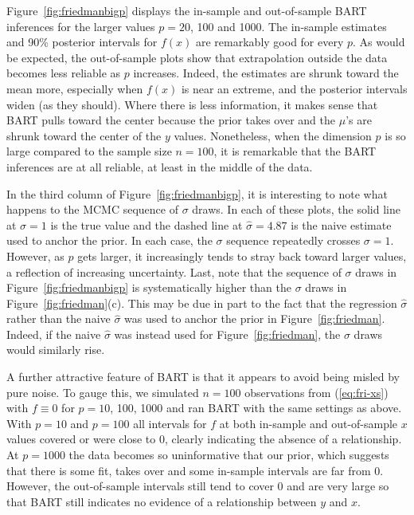 \documentclass[aoas,nameyear,dvips]{arximspdf}
\begin{document}
Figure~\ref{fig:friedmanbigp} displays the in-sample and
out-of-sample BART inferences for the larger values $p = 20$, 100
and 1000. The in-sample estimates and 90\% posterior intervals for
$f(x)$ are remarkably good for every $p$.  As would be expected,
the out-of-sample plots show that extrapolation outside the data
becomes less reliable as $p$ increases.  Indeed, the estimates
are shrunk toward the mean more, especially when $f(x)$ is near an extreme, and the
posterior intervals widen (as they should). Where there is less
information, it makes sense that BART pulls toward the center
because the prior takes over and the $\mu$'s are shrunk toward
the center of the $y$ values.  Nonetheless, when the dimension
$p$ is so large compared to the sample size $n = 100$, it is
remarkable that the BART inferences are at all reliable,
at least in the middle of the data.

In the third column of Figure~\ref{fig:friedmanbigp}, it is
interesting to note what happens to the MCMC sequence of $\sigma$
draws. In each of these plots, the solid line at $\sigma = 1$ is
the true value and the dashed line at $\hat\sigma = 4.87$ is the
naive estimate used to anchor the prior.  In each case, the
$\sigma$ sequence repeatedly crosses $\sigma = 1$. However, as $p$
gets larger, it increasingly tends to stray back toward larger
values, a reflection of increasing uncertainty. Last, note that
the sequence of $\sigma$ draws in Figure~\ref{fig:friedmanbigp}
is systematically higher than the $\sigma$ draws in
Figure~\ref{fig:friedman}(c). This may be due in part to the fact that
the regression $\hat\sigma$ rather than the naive $\hat\sigma$ was
used to anchor the prior in Figure~\ref{fig:friedman}. Indeed, if
the naive $\hat\sigma$ was instead used for
Figure~\ref{fig:friedman}, the $\sigma$ draws would similarly
rise.

A further attractive feature of BART is that it appears to avoid
being misled by pure noise.  To gauge this, we simulated $n = 100$
observations from (\ref{eq:fri-xs}) with $f \equiv 0$ for
$p=10$, 100, 1000 and ran BART with the same settings as above. With
$p=10$ and $p=100$ all intervals for $f$ at both in-sample and
out-of-sample $x$ values covered or were close to 0, clearly
indicating the absence of a relationship. At $p=1000$ the data
becomes so uninformative that our prior, which suggests that there
is some fit, takes over and some in-sample intervals are far from
0. However, the out-of-sample intervals still tend to cover 0 and
are very large so that BART still indicates  no evidence of a
relationship between $y$ and $x$.
\end{document}
